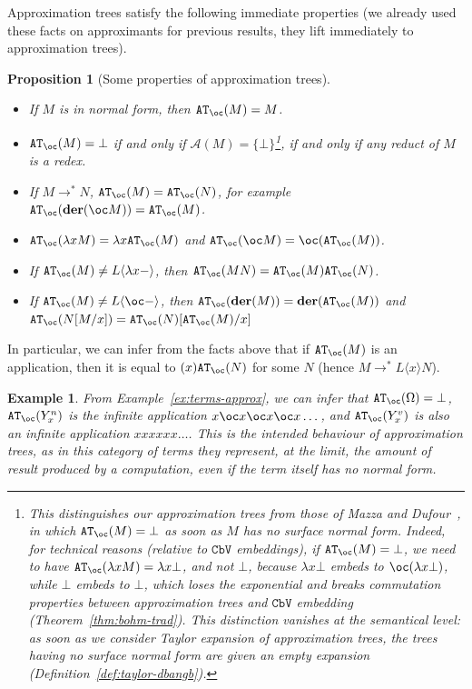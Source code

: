 \documentclass[10pt,a4paper]{article}
\newtheorem{proposition}[theorem]{Proposition}
\newtheorem{example}[theorem]{Example}
\newcommand{\<}{\langle}
\renewcommand{\>}{\rangle}
\newcommand{\der}[1]{\ensuremath{\mathbf{der}(#1)}}
\newcommand{\cbv}{\ensuremath{\mathtt{CbV}}}
\newcommand{\mcal}[1]{\ensuremath{\mathcal{#1}}}
\newcommand{\setApprox}{\mcal{A}}
\newcommand{\btb}{\ensuremath{{\tt{AT}_\oc}}}
\begin{document}
Approximation trees satisfy the following immediate properties (we already used these facts on approximants for previous results, they lift immediately to approximation trees).
\begin{proposition}[Some properties of approximation trees]\label{prop:bohm-properties}~
	\begin{itemize}
		\item If $M$ is in normal form, then $\btb(M)=M$.
		\item $\btb(M)=\bot$ if and only if
			$\setApprox(M)=\{\bot\}$\footnote{
				This distinguishes our approximation trees from those of
				Mazza and Dufour~\cite{mazza-dufour}, in which
				$\btb(M)=\bot$ as soon as $M$ has no surface
				normal form. Indeed, for technical reasons
				(relative to \cbv{}
				embeddings), if $\btb(M)=\bot$,
				we need to have $\btb(\lambda xM)=\lambda
				x\bot$, and not $\bot$, because $\lambda x\bot$
				embeds to $\oc(\lambda x\bot)$, while $\bot$
				embeds to $\bot$, which loses the exponential
				and breaks commutation properties between approximation
				trees and \cbv{} embedding
				(Theorem~\ref{thm:bohm-trad}). This distinction
				vanishes at the semantical level: as soon as we
				consider Taylor expansion of approximation trees, the
				trees having no surface normal form are given an
				empty expansion
				(Definition~\ref{def:taylor-dbangb}).
			}, if and only if any reduct of $M$ is a redex.
		\item If $M\to^*N$, $\btb(M)=\btb(N)$, for example
		 $\btb(\der{\oc M})=\btb(M)$.
		\item $\btb(\lambda xM)=\lambda x\btb(M)$ and $\btb(\oc M)=\oc(\btb(M))$.
		\item If $\btb(M)\neq L\<\lambda x-\>$, then
			$\btb(MN)=\btb(M)\btb(N)$.
		\item If $\btb(M)\neq L\<\oc-\>$, then $\btb(\der M)=\der{\btb(M)}$ and
			$\btb(N[M/x])=\btb(N)[\btb(M)/x]$
	\end{itemize}
\end{proposition}
In particular, we can infer from the facts above that if $\btb(M)$ is an application, then
it is equal to $(x)\btb(N)$ for some $N$ (hence $M\to^*L\<x\>N$).

\begin{example}\label{ex:terms-bt}
	From Example~\ref{ex:terms-approx}, we can infer that
	$\btb(\Omega)=\bot$, $\btb(Y^n_x)$ is the infinite application $x\oc
	x\oc x\oc x\dots $, and $\btb(Y^v_x)$ is also an infinite application
	$xxxxxx\dots $. This is the intended behaviour of approximation trees, as in this
	category of terms they represent, at the limit, the amount of result
	produced by a computation, even if the term itself has no normal form.
\end{example}
\end{document}
